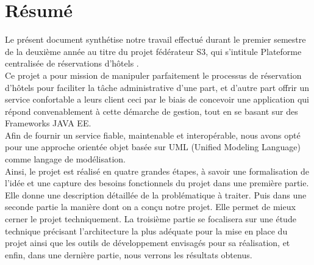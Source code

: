 \documentclass[12pt,a4paper]{report}
\begin{document}
	\chapter*{Résumé}
	Le présent document synthétise notre travail effectué durant le premier semestre de la deuxième année au titre du projet fédérateur S3, qui s’intitule \guillemotleft Plateforme centralisée de réservations d’hôtels \guillemotright.\\
Ce projet a pour mission de manipuler parfaitement le processus de réservation d’hôtels pour faciliter la tâche administrative d’une part, et d’autre part offrir un service confortable a leurs client ceci par le biais de concevoir une application qui répond convenablement à cette démarche de gestion, tout en se basant sur des Frameworks JAVA EE.\\
Afin de fournir un service fiable, maintenable et interopérable, nous avons opté pour une approche orientée objet basée sur UML (Unified Modeling Language) comme langage de modélisation.\\
Ainsi, le projet est réalisé en quatre grandes étapes, à savoir une formalisation de l’idée et une capture des besoins fonctionnels du projet dans une première partie. Elle donne une description détaillée de la problématique à traiter. Puis dans une seconde partie la manière dont on a conçu notre projet. Elle permet de mieux cerner le projet techniquement. La troisième partie se focalisera sur une étude technique précisant l’architecture la plus adéquate pour la mise en place du projet ainsi que les outils de développement envisagés pour sa réalisation, et enfin, dans une dernière partie, nous verrons les résultats obtenus.


\end{document}
